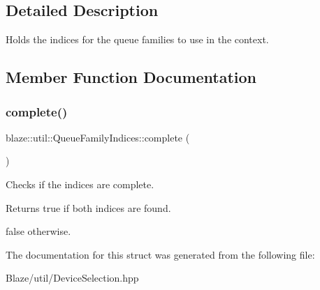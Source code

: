 \subsection{Detailed Description}
Holds the indices for the queue families to use in the context. 

\subsection{Member Function Documentation}
\mbox{\label{structblaze_1_1util_1_1QueueFamilyIndices_a23bf708816aa6ff4e554610003056885}} 
\subsubsection{\texorpdfstring{complete()}{complete()}}
{\footnotesize\ttfamily blaze\+::util\+::\+Queue\+Family\+Indices\+::complete (\begin{DoxyParamCaption}{ }\end{DoxyParamCaption})\hspace{0.3cm}{\ttfamily [inline]}}



Checks if the indices are complete. 

\begin{DoxyReturn}{Returns}
true if both indices are found. 

false otherwise. 
\end{DoxyReturn}


The documentation for this struct was generated from the following file\+:\begin{DoxyCompactItemize}
\item 
Blaze/util/Device\+Selection.\+hpp\end{DoxyCompactItemize}
